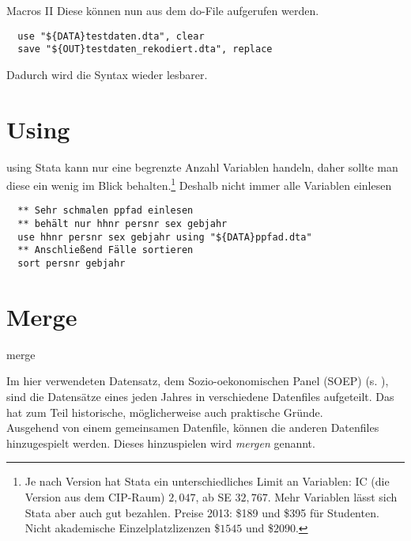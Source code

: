 \begin{frame}[fragile]{Macros II}
Diese können nun aus dem do-File aufgerufen werden. 
\begin{lstlisting}
  use "${DATA}testdaten.dta", clear
  save "${OUT}testdaten_rekodiert.dta", replace
\end{lstlisting}
Dadurch wird die Syntax wieder lesbarer.


\end{frame}

\section{Using}
\begin{frame}[fragile]{using}  
Stata kann nur eine begrenzte Anzahl Variablen handeln, daher sollte man diese ein wenig im Blick behalten.\footnote{Je nach Version hat Stata ein unterschiedliches Limit an Variablen: IC (die Version aus dem CIP-Raum) $2,047$, ab SE $32,767$. Mehr Variablen lässt sich Stata aber auch gut bezahlen. Preise 2013: \$189 und \$395 für Studenten. Nicht akademische Einzelplatzlizenzen \$$1545$ und \$$2090$.} Deshalb nicht immer alle Variablen einlesen
\begin{lstlisting}
  ** Sehr schmalen ppfad einlesen
  ** behält nur hhnr persnr sex gebjahr
  use hhnr persnr sex gebjahr using "${DATA}ppfad.dta"
  ** Anschließend Fälle sortieren
  sort persnr gebjahr
\end{lstlisting}
\end{frame}

\section{Merge}
\begin{frame}{merge} 
\begin{minipage}{11cm}
Im hier verwendeten Datensatz, dem Sozio-oekonomischen Panel (SOEP) (s. \cite{Wagner07}), sind die Datensätze eines jeden Jahres in verschiedene Datenfiles aufgeteilt. Das hat zum Teil historische, möglicherweise auch praktische Gründe.\\
Ausgehend von einem gemeinsamen Datenfile, können die anderen Datenfiles hinzugespielt werden. Dieses hinzuspielen wird \textit{mergen} genannt.
\end{minipage}
\end{frame}

